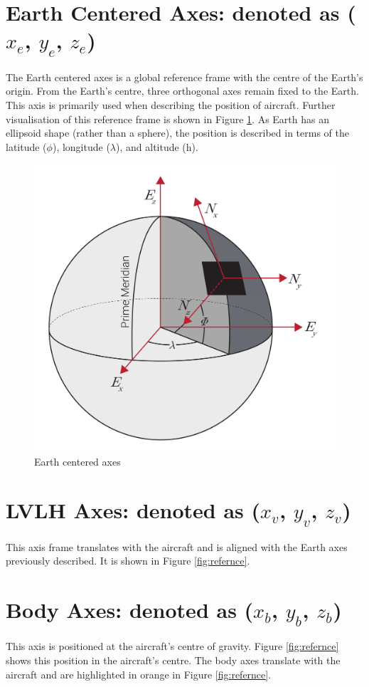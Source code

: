 \section{Earth Centered Axes: denoted as \texorpdfstring{($x_e$, $y_e$, $z_e$)}{L}}
The Earth centered axes is a global reference frame with the centre of the Earth's origin. From the Earth's centre, three orthogonal axes remain fixed to the Earth. This axis is primarily used when describing the position of aircraft. Further visualisation of this reference frame is shown in Figure \ref{fig:refernceEarth}. As Earth has an ellipsoid shape (rather than a sphere), the position is described in terms of the latitude ($\phi$), longitude ($\lambda$), and altitude (h).

\begin{figure}[H]
  \centering
  \includegraphics[width=0.7\linewidth]{03_LiteratureReview/Figs/ref_ecef.jpg}
  \caption{Earth centered axes \cite{VectorNAV}}
  \label{fig:refernceEarth}
\end{figure}

\section{LVLH Axes: denoted as \texorpdfstring{($x_v$, $y_v$, $z_v$)}{L}}
 This axis frame translates with the aircraft and is aligned with the Earth axes previously described. It is shown in Figure \ref{fig:refernce}.

\section{Body Axes: denoted as \texorpdfstring{($x_b$, $y_b$, $z_b$)}{L}} 
This axis is positioned at the aircraft's centre of gravity. Figure \ref{fig:refernce} shows this position in the aircraft's centre. The body axes translate with the aircraft and are highlighted in orange in Figure \ref{fig:refernce}.

